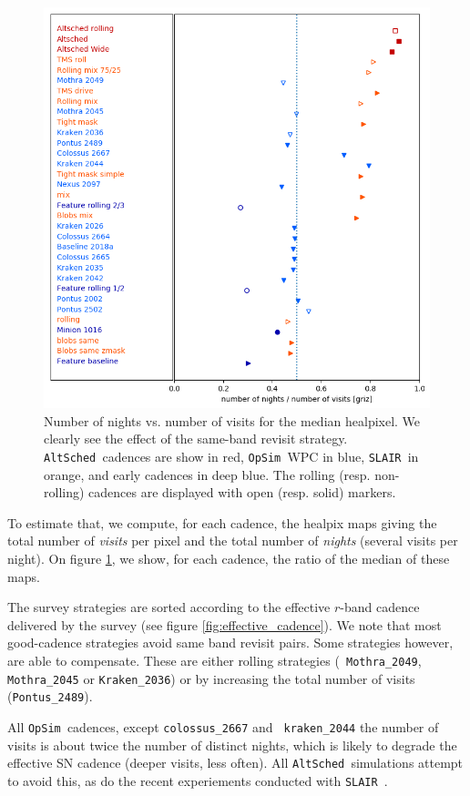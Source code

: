 \documentclass [11pt,a4paper]{article}
\newcommand{\opsim}{{\tt OpSim\ }}
\newcommand{\slair}{{\tt SLAIR\ }}
\newcommand{\altsched}{{\tt AltSched\ }}
\begin{document}
\begin{figure}
  \begin{center}
    \includegraphics[width=0.8\linewidth]{Figures/night_visit_ratio.png}
    \caption{Number of nights vs. number of visits for the median
      healpixel. We clearly see the effect of the same-band revisit
      strategy.  \altsched cadences are show in red, \opsim WPC in
      blue, \slair in orange, and early cadences in deep blue. The
      rolling (resp. non-rolling) cadences are displayed with open
      (resp. solid) markers. }
    \label{fig:effective_number_of_visits}
  \end{center}
\end{figure}

To estimate that, we compute, for each cadence, the healpix maps
giving the total number of {\em visits} per pixel and the total number
of {\em nights} (several visits per night).  On figure
\ref{fig:effective_number_of_visits}, we show, for each cadence, the
ratio of the median of these maps.  

The survey strategies are sorted according to the effective $r$-band
cadence delivered by the survey (see figure
\ref{fig:effective_cadence}).  We note that most good-cadence
strategies avoid same band revisit pairs. Some strategies however, are
able to compensate.  These are either rolling strategies ({\tt
  Mothra\_2049}, {\tt Mothra\_2045} or {\tt Kraken\_2036}) or by
increasing the total number of visits ({\tt Pontus\_2489}).

All \opsim cadences, except {\tt colossus\_2667} and {\tt
  kraken\_2044} the number of visits is about twice the number of
distinct nights, which is likely to degrade the effective SN cadence
(deeper visits, less often).  All \altsched simulations attempt to
avoid this, as do the recent experiements conducted with \slair.
\end{document}
